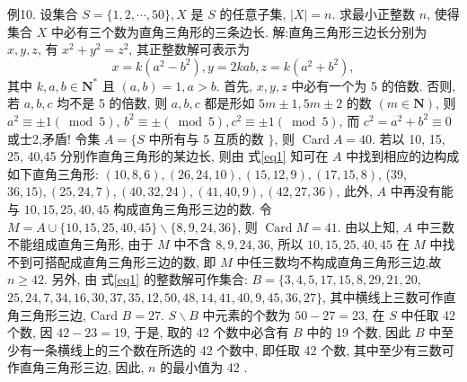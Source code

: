 例10. 设集合 $S=\{1,2, \cdots, 50\}, X$ 是 $S$ 的任意子集, $|X|=n$. 求最小正整数 $n$, 使得集合 $X$ 中必有三个数为直角三角形的三条边长.
解:直角三角形三边长分别为 $x, y, z$, 有 $x^2+y^2=z^2$, 其正整数解可表示为
$$
x=k\left(a^2-b^2\right), y=2 k a b, z=k\left(a^2+b^2\right), \label{eq1}
$$
其中 $k, a, b \in \mathbf{N}^*$ 且 $(a, b)=1, a>b$.
首先, $x, y, z$ 中必有一个为 5 的倍数.
否则, 若 $a, b, c$ 均不是 5 的倍数, 则 $a, b, c$ 都是形如 $5 m \pm 1,5 m \pm 2$ 的数 $(m \in \mathbf{N})$, 则 $a^2 \equiv \pm 1(\bmod 5)$, $b^2 \equiv \pm(\bmod 5), c^2 \equiv \pm 1(\bmod 5)$, 而 $c^2=a^2+b^2 \equiv 0$ 或士2,矛盾!
令集 $A=\{S$ 中所有与 5 互质的数 $\}$, 则 $\operatorname{Card} A=40$. 若以 10, 15, 25, 40,45 分别作直角三角形的某边长, 则由 式\ref{eq1} 知可在 $A$ 中找到相应的边构成如下直角三角形: $(10,8,6),(26,24,10),(15,12,9),(17,15,8)$, (39, $36,15),(25,24,7),(40,32,24),(41,40,9),(42,27,36)$, 此外, $A$ 中再没有能与 $10,15,25,40,45$ 构成直角三角形三边的数.
令 $M=A \cup\{10,15,25,40,45\} \backslash\{8,9,24,36\}$, 则 $\operatorname{Card} M=41$.
由以上知, $A$ 中三数不能组成直角三角形, 由于 $M$ 中不含 $8,9,24,36$, 所以 $10,15,25,40,45$ 在 $M$ 中找不到可搭配成直角三角形三边的数, 即 $M$ 中任三数均不构成直角三角形三边,故 $n \geqslant 42$.
另外, 由 式\ref{eq1} 的整数解可作集合: $B=\{3,4,5,17,15,8,29,21,20$, $25,24,7,34,16,30,37,35,12,50,48,14,41,40,9,45,36,27\}$, 其中横线上三数可作直角三角形三边, Card $B=27$.
$S \backslash B$ 中元素的个数为 $50-27=23$, 在 $S$ 中任取 42 个数, 因 $42-23=19$, 于是, 取的 42 个数中必含有 $B$ 中的 19 个数, 因此 $B$ 中至少有一条横线上的三个数在所选的 42 个数中, 即任取 42 个数, 其中至少有三数可作直角三角形三边, 因此, $n$ 的最小值为 42 .


